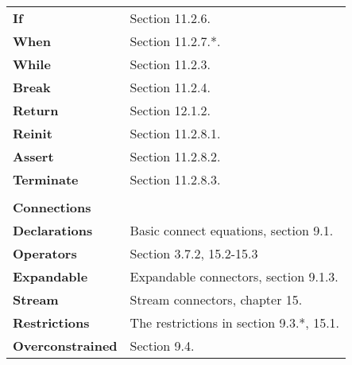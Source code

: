 \documentclass{article}
\begin{document}
\begin{tabular}{l l}
    \indent\textbf{If}               & Section 11.2.6. \\
    \indent\textbf{When}             & Section 11.2.7.*. \\
    \indent\textbf{While}            & Section 11.2.3. \\
    \indent\textbf{Break}            & Section 11.2.4. \\
    \indent\textbf{Return}           & Section 12.1.2. \\
    \indent\textbf{Reinit}           & Section 11.2.8.1. \\
    \indent\textbf{Assert}           & Section 11.2.8.2. \\
    \indent\textbf{Terminate}        & Section 11.2.8.3. \\
  \\
  \textbf{Connections} \\
    \indent\textbf{Declarations}     & Basic connect equations, section 9.1.  \\
    \indent\textbf{Operators}        & Section 3.7.2, 15.2-15.3 \\
    \indent\textbf{Expandable}       & Expandable connectors, section 9.1.3. \\
    \indent\textbf{Stream}           & Stream connectors, chapter 15. \\
    \indent\textbf{Restrictions}     & The restrictions in section 9.3.*, 15.1. \\
    \indent\textbf{Overconstrained}  & Section 9.4. \\

\end{tabular}
\end{document}
